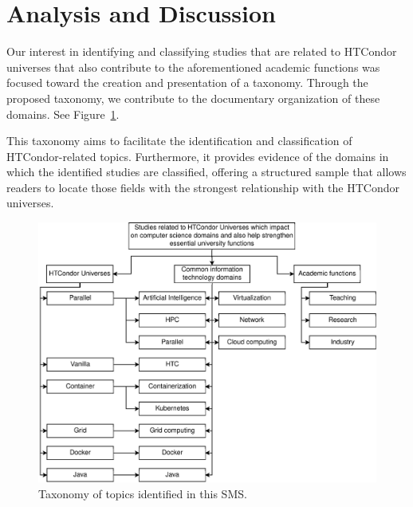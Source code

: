 \section{Analysis and Discussion}\label{sec:analisis-discusion}

Our interest in identifying and classifying studies that are related to HTCondor universes that also contribute to the aforementioned academic functions was focused toward the creation and presentation of a taxonomy. Through the proposed taxonomy, we contribute to the documentary organization of these domains. See Figure~\ref{fig:taxonomia}.

This taxonomy aims to facilitate the identification and classification of HTCondor-related topics. Furthermore, it provides evidence of the domains in which the identified studies are classified, offering a structured sample that allows readers to locate those fields with the strongest relationship with the HTCondor universes.


\begin{figure}
	\centering
	\includegraphics[scale=0.55]{resources/figures/sms-taxonomia.eps}
	\caption{Taxonomy of topics identified in this SMS.}
	\label{fig:taxonomia}
\end{figure}
